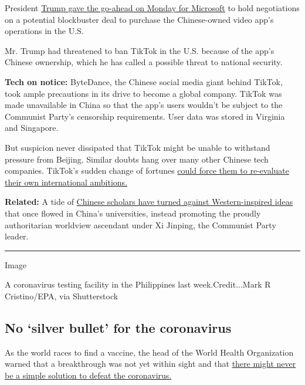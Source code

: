 President
\href{https://www.nytimes3xbfgragh.onion/2020/08/03/technology/trump-tiktok-microsoft.html?action=click\&module=Top\%20Stories\&pgtype=Homepage}{Trump
gave the go-ahead on Monday for Microsoft} to hold negotiations on a
potential blockbuster deal to purchase the Chinese-owned video app's
operations in the U.S.

Mr. Trump had threatened to ban TikTok in the U.S. because of the app's
Chinese ownership, which he has called a possible threat to national
security.

\textbf{Tech on notice:} ByteDance, the Chinese social media giant
behind TikTok, took ample precautions in its drive to become a global
company. TikTok was made unavailable in China so that the app's users
wouldn't be subject to the Communist Party's censorship requirements.
User data was stored in Virginia and Singapore.

But suspicion never dissipated that TikTok might be unable to withstand
pressure from Beijing. Similar doubts hang over many other Chinese tech
companies. TikTok's sudden change of fortunes
\href{https://www.nytimes3xbfgragh.onion/2020/08/03/technology/tiktok-bytedance-us-china.html}{could
force them to re-evaluate their own international ambitions.}

\textbf{Related:} A tide of
\href{https://www.nytimes3xbfgragh.onion/2020/08/02/world/asia/china-hong-kong-national-security-law.html}{Chinese
scholars have turned against Western-inspired ideas} that once flowed in
China's universities, instead promoting the proudly authoritarian
worldview ascendant under Xi Jinping, the Communist Party leader.

\begin{center}\rule{0.5\linewidth}{\linethickness}\end{center}

Image

A coronavirus testing facility in the Philippines last
week.Credit...Mark R Cristino/EPA, via Shutterstock

\hypertarget{no-silver-bullet-for-the-coronavirus}{%
\subsection{No `silver bullet' for the
coronavirus}\label{no-silver-bullet-for-the-coronavirus}}

As the world races to find a vaccine, the head of the World Health
Organization warned that a breakthrough was not yet within sight and
that
\href{https://www.nytimes3xbfgragh.onion/2020/08/03/world/coronavirus-covid-19.html?action=click\&pgtype=Article\&state=default\&module=styln-coronavirus\&region=TOP_BANNER\&context=storylines_menu}{there
might never be a simple solution to defeat the coronavirus.}

